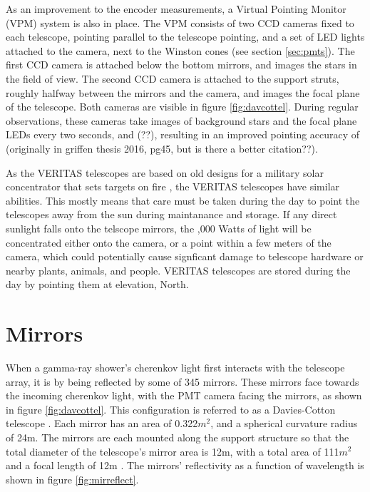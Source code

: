 As an improvement to the encoder measurements, a Virtual Pointing Monitor (VPM) system is also in place.
The VPM consists of two CCD cameras fixed to each telescope, pointing parallel to the telescope pointing, and a set of LED lights attached to the camera, next to the Winston cones (see section \ref{sec:pmts}).
The first CCD camera is attached below the bottom mirrors, and images the stars in the field of view.
The second CCD camera is attached to the support struts, roughly halfway between the mirrors and the camera, and images the focal plane of the telescope.
Both cameras are visible in figure \ref{fig:davcottel}.
During regular observations, these cameras take images of background stars and the focal plane LEDs every two seconds, and (??), resulting in an improved pointing accuracy of \degree (originally in griffen thesis 2016, pg45, but is there a better citation??).

As the VERITAS telescopes are based on old designs for a military solar concentrator that sets targets on fire \cite{daviescotton}, the VERITAS telescopes have similar abilities.
This mostly means that care must be taken during the day to point the telescopes away from the sun during maintanance and storage.
If any direct sunlight falls onto the telscope mirrors, the ,000 Watts of light will be concentrated either onto the camera, or a point within a few meters of the camera, which could potentially cause signficant damage to telescope hardware or nearby plants, animals, and people.
VERITAS telescopes are stored during the day by pointing them at \degree elevation, North.


\section{Mirrors}\label{sec:mirrors}

When a gamma-ray shower's cherenkov light first interacts with the telescope array, it is by being reflected by some of 345 mirrors.
These mirrors face towards the incoming cherenkov light, with the PMT camera facing the mirrors, as shown in figure \ref{fig:davcottel}.
This configuration is referred to as a Davies-Cotton telescope \cite{daviescotton}.
Each mirror has an area of 0.322$m^2$, and a spherical curvature radius of 24m.
The mirrors are each mounted along the support structure so that the total diameter of the telescope's mirror area is 12m, with a total area of 111$m^2$ and a focal length of 12m \cite{Veritas_Detector}.
The mirrors' reflectivity as a function of wavelength is shown in figure \ref{fig:mirreflect}.

